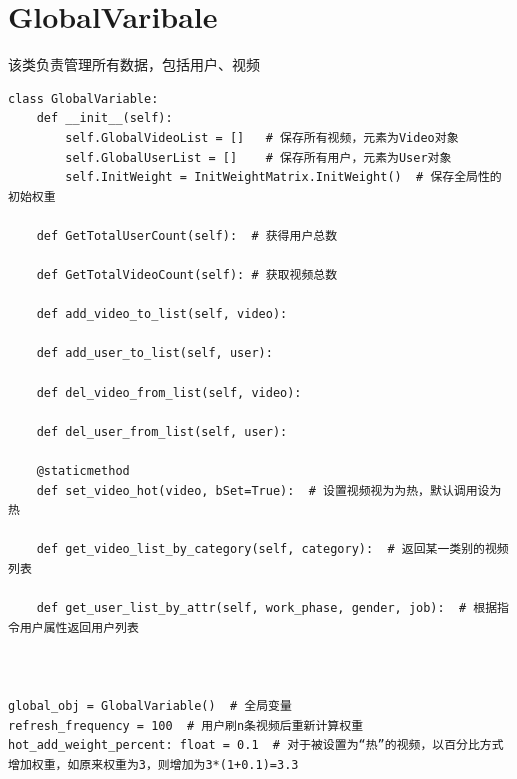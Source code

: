 \documentclass{article}
\begin{document}
\section{GlobalVaribale}
该类负责管理所有数据，包括用户、视频
\begin{lstlisting}
class GlobalVariable:
    def __init__(self):
        self.GlobalVideoList = []   # 保存所有视频，元素为Video对象
        self.GlobalUserList = []    # 保存所有用户，元素为User对象
        self.InitWeight = InitWeightMatrix.InitWeight()  # 保存全局性的初始权重

    def GetTotalUserCount(self):  # 获得用户总数
    
    def GetTotalVideoCount(self): # 获取视频总数
        
    def add_video_to_list(self, video):
        
    def add_user_to_list(self, user):
        
    def del_video_from_list(self, video):
       
    def del_user_from_list(self, user):

    @staticmethod
    def set_video_hot(video, bSet=True):  # 设置视频视为为热，默认调用设为热

    def get_video_list_by_category(self, category):  # 返回某一类别的视频列表

    def get_user_list_by_attr(self, work_phase, gender, job):  # 根据指令用户属性返回用户列表



global_obj = GlobalVariable()  # 全局变量
refresh_frequency = 100  # 用户刷n条视频后重新计算权重
hot_add_weight_percent: float = 0.1  # 对于被设置为“热”的视频，以百分比方式增加权重，如原来权重为3，则增加为3*(1+0.1)=3.3
\end{lstlisting}
\end{document}
